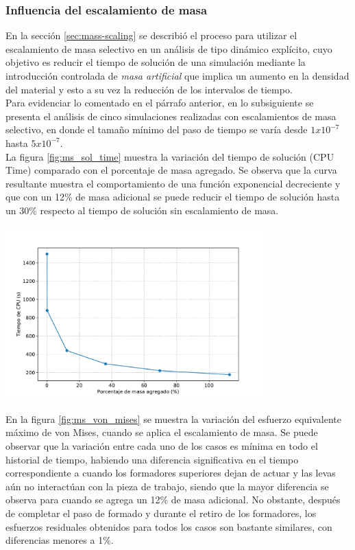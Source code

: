 \subsubsection{Influencia del escalamiento de masa}\label{sec:mass-scaling-results}

En la sección \ref{sec:mass-scaling} se describió el proceso para utilizar el escalamiento de masa 
selectivo en un análisis de tipo dinámico explícito, cuyo objetivo es reducir el tiempo de 
solución de una simulación mediante la introducción controlada de \textit{masa artificial} que implica 
un aumento en la densidad del material y esto a su vez la reducción de los intervalos de tiempo.\\

Para evidenciar lo comentado en el párrafo anterior, en lo subsiguiente se presenta el análisis de cinco simulaciones realizadas con escalamientos de 
masa selectivo, en donde el tamaño mínimo del paso de tiempo se varía desde $1x10^{-7}$ hasta 
$5x10^{-7}$.\\

La figura \ref{fig:ms_sol_time} muestra la variación del tiempo de solución (CPU Time) comparado con 
el porcentaje de masa agregado. Se observa que la curva resultante muestra el comportamiento de 
una función exponencial decreciente y que con un 12\% de masa adicional se puede reducir el tiempo 
de solución hasta un 30\% respecto al tiempo de solución sin escalamiento de masa.

\begin{center}
\includegraphics[width=0.75\textwidth]{src/ch4/ms_sol_time.pdf}
\label{fig:ms_sol_time}
\end{center}

En la figura \ref{fig:ms_von_mises} se muestra la variación del esfuerzo equivalente máximo de von Mises, cuando 
se aplica el escalamiento de masa. Se puede observar que la variación entre cada uno de los casos 
es mínima en todo el historial de tiempo, habiendo una diferencia significativa en el tiempo 
correspondiente a cuando los formadores superiores dejan de actuar y las levas aún no interactúan 
con la pieza de trabajo, siendo que la mayor diferencia se observa para cuando se agrega un 12\% de masa adicional.
No obstante, después de completar el paso de formado y durante el retiro de los formadores, los esfuerzos residuales 
obtenidos para todos los casos son bastante similares, con diferencias menores a 1\%.

